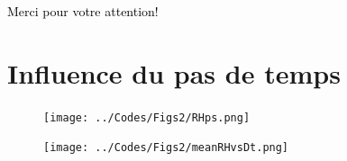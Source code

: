 \documentclass[10pt]{beamer}
\begin{document}
{
\begin{frame}
  \centering
  \Large 
  \textcolor{black}{Merci pour votre attention!}
\end{frame}
}

\section*{Influence du pas de temps}

\begin{frame}{\secname}

    \begin{figure}[hbtp]
        \centering
        \texttt{[image: ../Codes/Figs2/RHps.png]}
    \end{figure}
    
\end{frame}

\begin{frame}{\secname}
    \begin{figure}[hbtp]
        \centering
        \texttt{[image: ../Codes/Figs2/meanRHvsDt.png]}
    \end{figure}
\end{frame}
\end{document}
